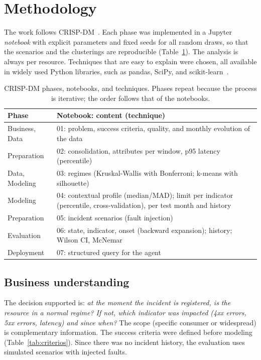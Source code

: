\documentclass[sigconf,nonacm]{acmart}
\begin{document}
\section{Methodology}\label{sec:metodologia}

The work follows CRISP-DM~\citep{chapman2000crispdm,wirth2000crispdm}. Each phase was implemented in a Jupyter \emph{notebook} with explicit parameters and fixed seeds for all random draws, so that the scenarios and the clusterings are reproducible (Table~\ref{tab:fases}). The analysis is always per resource. Techniques that are easy to explain were chosen, all available in widely used Python libraries, such as pandas, SciPy, and scikit-learn~\citep{pedregosa2011sklearn}.


\begin{table}[t]
  \caption{CRISP-DM phases, notebooks, and techniques. Phases repeat because
  the process is iterative; the order follows that of the notebooks.}
  \label{tab:fases}
  \small
  \begin{tabular}{p{}p{}}
    \toprule
    Phase & Notebook: content (technique) \\
    \midrule
    Business, Data & 01: problem, success criteria, quality, and monthly evolution of the data \\
    Preparation & 02: consolidation, attributes per window, p95 latency (percentile) \\
    Data, Modeling & 03: regimes (Kruskal-Wallis with Bonferroni; k-means with silhouette) \\
    Modeling & 04: contextual profile (median/MAD); limit per indicator (percentile, cross-validation), per test month and history \\
    Preparation & 05: incident scenarios (fault injection) \\
    Evaluation & 06: state, indicator, onset (backward expansion); history; Wilson CI, McNemar \\
    Deployment & 07: structured query for the agent \\
    \bottomrule
  \end{tabular}
\end{table}

\subsection{Business understanding}
The decision supported is: \emph{at the moment the incident is registered, is the resource in a normal regime? If not, which indicator was impacted (4xx errors, 5xx errors, latency) and since when?} The scope (specific consumer or widespread) is complementary information. The success criteria were defined before modeling (Table~\ref{tab:criterios}). Since there was no incident history, the evaluation uses simulated scenarios with injected faults.
\end{document}
